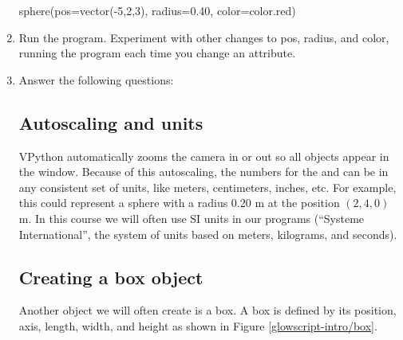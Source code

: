 \begin{enumerate}
\begin{myvpython}	
sphere(pos=vector(-5,2,3), radius=0.40, color=color.red)
\end{myvpython}

	\item Run the program.  Experiment with other changes to pos, radius, and color, running the program each time you change an attribute.
	
	\item Answer the following questions:
	

	\subsection*{Autoscaling and units}

VPython automatically zooms the camera in or out so all objects appear in the window. Because of this autoscaling, the numbers for the  and  can be in any consistent set of units, like meters, centimeters, inches, etc. For example, this could represent a sphere with a radius 0.20 m at the position $(2,4,0)$ m. In this course we will often use SI units in our programs (``Systeme International'', the system of units based on meters, kilograms, and seconds).

	\subsection*{Creating a box object}

Another object we will often create is a box. A box is defined by its position, axis, length, width, and height as shown in Figure \ref{glowscript-intro/box}.


\end{enumerate}
